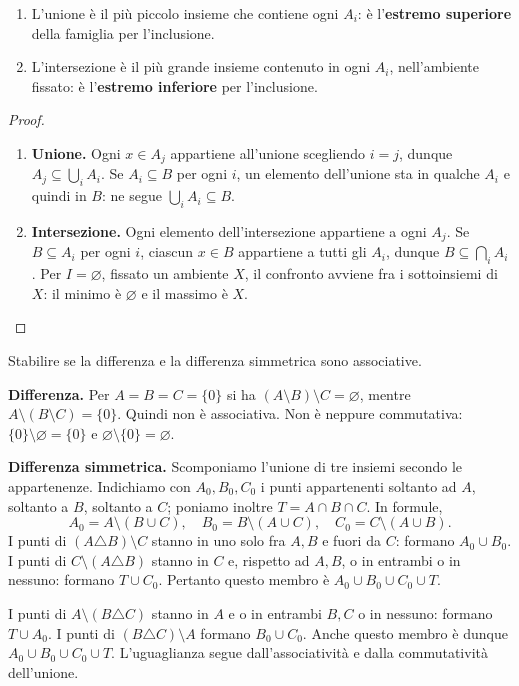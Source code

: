 \begin{proposizione}
\begin{enumerate}[label=\arabic*.]
\item L'unione è il più piccolo insieme che contiene ogni $A_i$: è l'\textbf{estremo superiore} della famiglia per l'inclusione.
\item L'intersezione è il più grande insieme contenuto in ogni $A_i$, nell'ambiente fissato: è l'\textbf{estremo inferiore} per l'inclusione.
\end{enumerate}
\end{proposizione}
\begin{proof}
\begin{enumerate}[label=\arabic*.]
\item \textbf{Unione.} Ogni $x\in A_j$ appartiene all'unione scegliendo $i=j$, dunque $A_j\subseteq\bigcup_i A_i$. Se $A_i\subseteq B$ per ogni $i$, un elemento dell'unione sta in qualche $A_i$ e quindi in $B$: ne segue $\bigcup_i A_i\subseteq B$.
\item \textbf{Intersezione.} Ogni elemento dell'intersezione appartiene a ogni $A_j$. Se $B\subseteq A_i$ per ogni $i$, ciascun $x\in B$ appartiene a tutti gli $A_i$, dunque $B\subseteq\bigcap_i A_i$. Per $I=\varnothing$, fissato un ambiente $X$, il confronto avviene fra i sottoinsiemi di $X$: il minimo è $\varnothing$ e il massimo è $X$.
\end{enumerate}
\end{proof}

\begin{esercizio}
Stabilire se la differenza e la differenza simmetrica sono associative.
\end{esercizio}
\begin{svolgimento}
\textbf{Differenza.} Per $A=B=C=\{0\}$ si ha $(A\setminus B)\setminus C=\varnothing$, mentre $A\setminus(B\setminus C)=\{0\}$. Quindi non è associativa. Non è neppure commutativa: $\{0\}\setminus\varnothing=\{0\}$ e $\varnothing\setminus\{0\}=\varnothing$.

\textbf{Differenza simmetrica.} Scomponiamo l'unione di tre insiemi secondo le appartenenze. Indichiamo con $A_0,B_0,C_0$ i punti appartenenti soltanto ad $A$, soltanto a $B$, soltanto a $C$; poniamo inoltre $T=A\cap B\cap C$. In formule,
\[
A_0=A\setminus(B\cup C),\quad B_0=B\setminus(A\cup C),\quad C_0=C\setminus(A\cup B).
\]
 I punti di $(A\triangle B)\setminus C$ stanno in uno solo fra $A,B$ e fuori da $C$: formano $A_0\cup B_0$. I punti di $C\setminus(A\triangle B)$ stanno in $C$ e, rispetto ad $A,B$, o in entrambi o in nessuno: formano $T\cup C_0$. Pertanto questo membro è $A_0\cup B_0\cup C_0\cup T$.

 I punti di $A\setminus(B\triangle C)$ stanno in $A$ e o in entrambi $B,C$ o in nessuno: formano $T\cup A_0$. I punti di $(B\triangle C)\setminus A$ formano $B_0\cup C_0$. Anche questo membro è dunque $A_0\cup B_0\cup C_0\cup T$. L'uguaglianza segue dall'associatività e dalla commutatività dell'unione.
\end{svolgimento}

